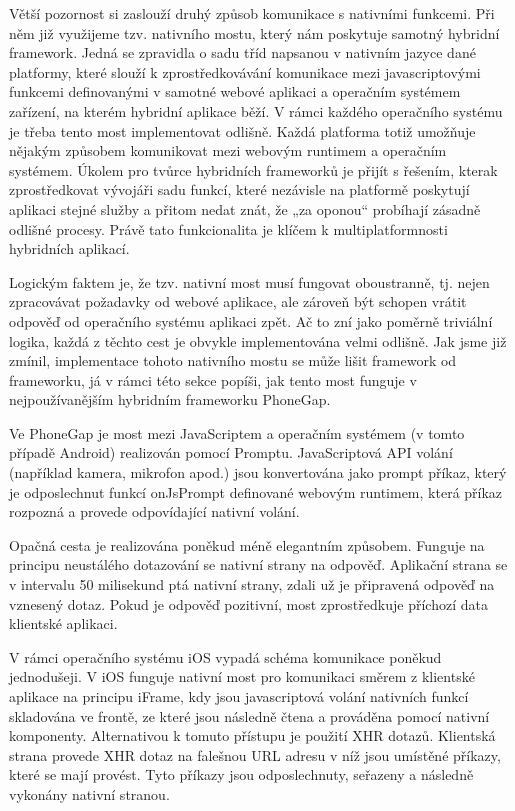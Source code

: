 Větší pozornost si zaslouží druhý způsob komunikace s nativními funkcemi. Při něm již využijeme tzv. nativního mostu, který nám poskytuje samotný hybridní framework. Jedná se zpravidla o sadu tříd napsanou v nativním jazyce dané platformy, které slouží k zprostředkovávání komunikace mezi javascriptovými funkcemi definovanými v samotné webové aplikaci a operačním systémem zařízení, na kterém hybridní aplikace běží. V rámci každého operačního systému je třeba tento most implementovat odlišně. Každá platforma totiž umožňuje nějakým způsobem komunikovat mezi webovým runtimem a operačním systémem. Úkolem pro tvůrce hybridních frameworků je přijít s řešením, kterak zprostředkovat vývojáři sadu funkcí, které nezávisle na platformě poskytují aplikaci stejné služby a přitom nedat znát, že „za oponou“ probíhají zásadně odlišné procesy. Právě tato funkcionalita je klíčem k multiplatformnosti hybridních aplikací.

Logickým faktem je, že tzv. nativní most musí fungovat oboustranně, tj. nejen zpracovávat požadavky od webové aplikace, ale zároveň být schopen vrátit odpověď od operačního systému aplikaci zpět. Ač to zní jako poměrně triviální logika, každá z těchto cest je obvykle implementována velmi odlišně. Jak jsme již zmínil, implementace tohoto nativního mostu se může lišit framework od frameworku, já v rámci této sekce popíši, jak tento most funguje v nejpoužívanějším hybridním frameworku PhoneGap.

Ve PhoneGap je most mezi JavaScriptem a operačním systémem (v tomto případě Android) realizován pomocí Promptu. JavaScriptová API volání (například kamera, mikrofon apod.) jsou konvertována jako prompt příkaz, který je odposlechnut funkcí onJsPrompt definované webovým runtimem, která příkaz rozpozná a provede odpovídající nativní volání. \cite{dissecting_phonegap_architecture} 

Opačná cesta je realizována poněkud méně elegantním způsobem. Funguje na principu neustálého dotazování se nativní strany na odpověď. Aplikační strana se v intervalu 50 milisekund ptá nativní strany, zdali už je připravená odpověď na vznesený dotaz. Pokud je odpověď pozitivní, most zprostředkuje příchozí data klientské aplikaci.

V rámci operačního systému iOS vypadá schéma komunikace poněkud jednodušeji. V iOS funguje nativní most pro komunikaci směrem z klientské aplikace na principu iFrame, kdy jsou javascriptová volání nativních funkcí skladována ve frontě, ze které jsou následně čtena a prováděna pomocí nativní komponenty. Alternativou k tomuto přístupu je použití XHR dotazů. Klientská strana provede XHR dotaz na falešnou URL adresu v níž jsou umístěné příkazy, které se mají provést. Tyto příkazy jsou odposlechnuty, seřazeny a následně vykonány nativní stranou. \cite{dissecting_phonegap_architecture}

